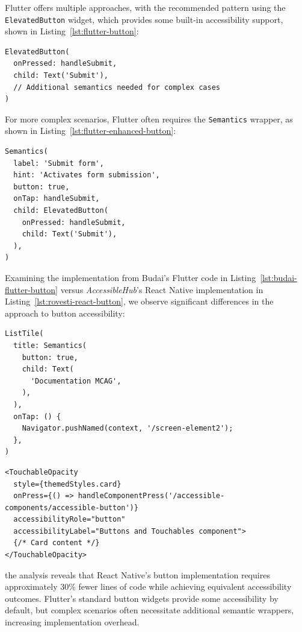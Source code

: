 Flutter offers multiple approaches, with the recommended pattern using the \texttt{ElevatedButton} widget, which provides some built-in accessibility support, shown in Listing~\ref{lst:flutter-button}:

\begin{lstlisting}[style=DartStyle, caption=Accessible button in Flutter, label=lst:flutter-button]
ElevatedButton(
  onPressed: handleSubmit,
  child: Text('Submit'),
  // Additional semantics needed for complex cases
)
\end{lstlisting}

For more complex scenarios, Flutter often requires the \texttt{Semantics} wrapper, as shown in Listing~\ref{lst:flutter-enhanced-button}:

\begin{lstlisting}[style=DartStyle, caption=Enhanced button accessibility in Flutter, label=lst:flutter-enhanced-button]
Semantics(
  label: 'Submit form',
  hint: 'Activates form submission',
  button: true,
  onTap: handleSubmit,
  child: ElevatedButton(
    onPressed: handleSubmit,
    child: Text('Submit'),
  ),
)
\end{lstlisting}

Examining the implementation from Budai's Flutter code in Listing~\ref{lst:budai-flutter-button} versus \textit{AccessibleHub}'s React Native implementation in Listing~\ref{lst:rovesti-react-button}, we observe significant differences in the approach to button accessibility:

\begin{lstlisting}[style=DartStyle, caption=Budai's Flutter implementation of accessible buttons, label=lst:budai-flutter-button]
ListTile(
  title: Semantics(
    button: true,
    child: Text(
      'Documentation MCAG',
    ),
  ),
  onTap: () {
    Navigator.pushNamed(context, '/screen-element2');
  },
)
\end{lstlisting}

\begin{lstlisting}[style=ReactNativeStyle, caption=AccessibleHub's React Native implementation of accessible buttons, label=lst:rovesti-react-button]
<TouchableOpacity
  style={themedStyles.card}
  onPress={() => handleComponentPress('/accessible-components/accessible-button')}
  accessibilityRole="button"
  accessibilityLabel="Buttons and Touchables component">
  {/* Card content */}
</TouchableOpacity>
\end{lstlisting}

the analysis reveals that React Native's button implementation requires approximately 30\% fewer lines of code while achieving equivalent accessibility outcomes. Flutter's standard button widgets provide some accessibility by default, but complex scenarios often necessitate additional semantic wrappers, increasing implementation overhead.

